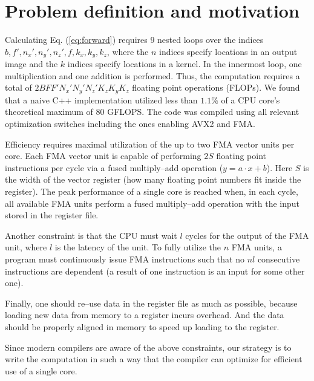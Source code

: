 \section{Problem definition and motivation}

  Calculating Eq. (\ref{eq:forward}) requires 9 nested loops over the
  indices $b,f',n_x',n_y',n_z',f,k_x,k_y,k_z$, where the $n$ indices
  specify locations in an output image and the $k$ indices specify
  locations in a kernel.  In the innermost loop, one multiplication
  and one addition is performed.  Thus, the computation requires a
  total of $2BFF'N_x'N_y'N_z'K_zK_yK_z$ floating point operations
  (FLOPs).  We found that a naive C++ implementation utilized less
  than $1.1\%$ of a CPU core's theoretical maximum of $80$ GFLOPS.
  The code was compiled using all relevant optimization switches
  including the ones enabling AVX2 and FMA.

  Efficiency
  requires maximal utilization of the up to two FMA vector units per
  core.  Each FMA vector unit is capable of performing $2S$ floating
  point instructions per cycle via a fused multiply--add operation ($y
  = a\cdot x + b$).  Here $S$ is the width of the vector register (how
  many floating point numbers fit inside the register).  The peak
  performance of a single core is reached when, in each cycle, all
  available FMA units perform a fused multiply--add operation with the
  input stored in the register file.

  Another constraint is that the CPU must wait $l$ cycles for the
  output of the FMA unit, where $l$ is the latency of the unit.  To
  fully utilize the $n$ FMA units, a program must continuously issue
  FMA instructions such that no $nl$ consecutive instructions are
  dependent (a result of one instruction is an input for some other
  one).

  Finally, one should re--use data in the register file as much as
  possible, because loading new data from memory to a register incurs
  overhead.  And the data should be properly aligned in memory to
  speed up loading to the register.

  Since modern compilers are aware of the above constraints, our
  strategy is to write the computation in such a way that the
  compiler can optimize for efficient use of a single core.

